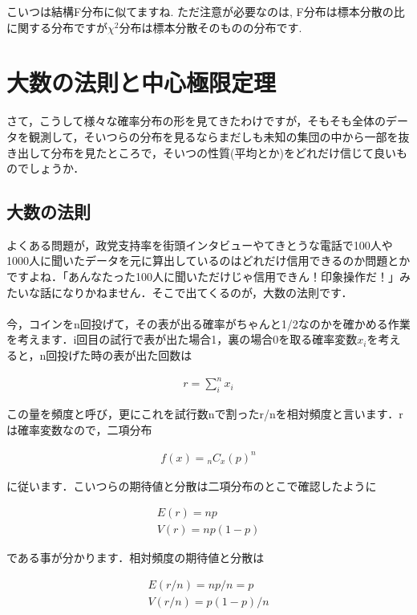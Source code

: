 \documentclass[11pt,a4paper]{ujreport} 	%
\begin{document}
こいつは結構F分布に似てますね. ただ注意が必要なのは, F分布は標本分散の比に関する分布ですが$\chi^2$分布は標本分散そのものの分布です.


\chapter{大数の法則と中心極限定理}
さて，こうして様々な確率分布の形を見てきたわけですが，そもそも全体のデータを観測して，そいつらの分布を見るならまだしも未知の集団の中から一部を抜き出して分布を見たところで，そいつの性質(平均とか)をどれだけ信じて良いものでしょうか．\\


\section{大数の法則}

よくある問題が，政党支持率を街頭インタビューやてきとうな電話で100人や1000人に聞いたデータを元に算出しているのはどれだけ信用できるのか問題とかですよね．「あんなたった100人に聞いただけじゃ信用できん！印象操作だ！」みたいな話になりかねません．そこで出てくるのが，大数の法則です．\\
\\

今，コインをn回投げて，その表が出る確率がちゃんと1/2なのかを確かめる作業を考えます．i回目の試行で表が出た場合1，裏の場合0を取る確率変数$x_i$を考えると，n回投げた時の表が出た回数は

\begin{align}
  r = \sum_i^n x_i
\end{align}

この量を頻度と呼び，更にこれを試行数nで割ったr/nを相対頻度と言います．rは確率変数なので，二項分布

\begin{align}
  f(x) = {}_n C_x (p)^n
\end{align}


に従います．こいつらの期待値と分散は二項分布のとこで確認したように

\begin{align}
  E(r) = np\\
  V(r) = np(1-p)
\end{align}

である事が分かります．相対頻度の期待値と分散は

\begin{align}
  E(r/n) = np/n = p\\
  V(r/n) = p(1-p)/n
\end{align}
\end{document}
